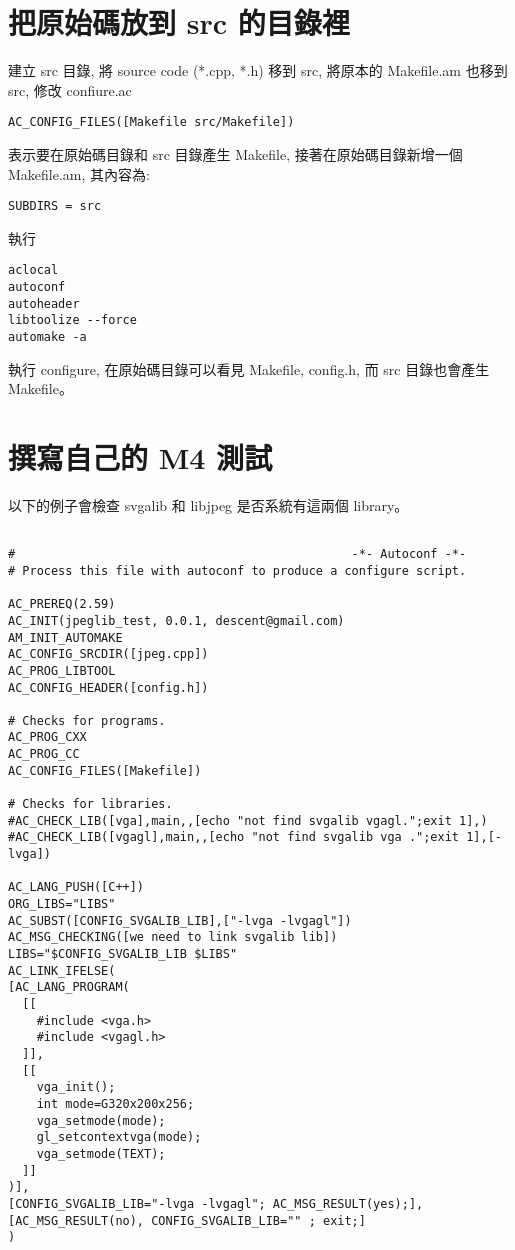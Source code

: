 \documentclass[12pt,a4]{article}
\begin{document}
\begin{CJK}{UTF8}{cwmu}
\section{把原始碼放到 src 的目錄裡}
建立 src 目錄, 將 source code (*.cpp, *.h) 移到 src,
將原本的 Makefile.am 也移到 src,
修改 confiure.ac


\begin{verbatim}
AC_CONFIG_FILES([Makefile src/Makefile])
\end{verbatim}

表示要在原始碼目錄和 src 目錄產生 Makefile,
接著在原始碼目錄新增一個 Makefile.am,
其內容為:

\begin{verbatim}
SUBDIRS = src
\end{verbatim}


執行
\begin{verbatim}
aclocal
autoconf
autoheader
libtoolize --force 
automake -a
\end{verbatim}

執行 configure,
在原始碼目錄可以看見 Makefile, config.h,
而 src 目錄也會產生 Makefile。


\section{撰寫自己的 M4 測試}
以下的例子會檢查 svgalib 和 libjpeg 是否系統有這兩個 library。
\begin{verbatim}

#                                               -*- Autoconf -*-
# Process this file with autoconf to produce a configure script.

AC_PREREQ(2.59)
AC_INIT(jpeglib_test, 0.0.1, descent@gmail.com)
AM_INIT_AUTOMAKE
AC_CONFIG_SRCDIR([jpeg.cpp])
AC_PROG_LIBTOOL
AC_CONFIG_HEADER([config.h])

# Checks for programs.
AC_PROG_CXX
AC_PROG_CC
AC_CONFIG_FILES([Makefile])

# Checks for libraries.
#AC_CHECK_LIB([vga],main,,[echo "not find svgalib vgagl.";exit 1],)
#AC_CHECK_LIB([vgagl],main,,[echo "not find svgalib vga .";exit 1],[-lvga])

AC_LANG_PUSH([C++])
ORG_LIBS="LIBS"
AC_SUBST([CONFIG_SVGALIB_LIB],["-lvga -lvgagl"])
AC_MSG_CHECKING([we need to link svgalib lib])
LIBS="$CONFIG_SVGALIB_LIB $LIBS"
AC_LINK_IFELSE(
[AC_LANG_PROGRAM(
  [[
    #include <vga.h>
    #include <vgagl.h>
  ]],
  [[
    vga_init();
    int mode=G320x200x256;
    vga_setmode(mode);
    gl_setcontextvga(mode);
    vga_setmode(TEXT);
  ]]
)],
[CONFIG_SVGALIB_LIB="-lvga -lvgagl"; AC_MSG_RESULT(yes);],
[AC_MSG_RESULT(no), CONFIG_SVGALIB_LIB="" ; exit;]
)


\end{verbatim}
\end{CJK}
\end{document}
